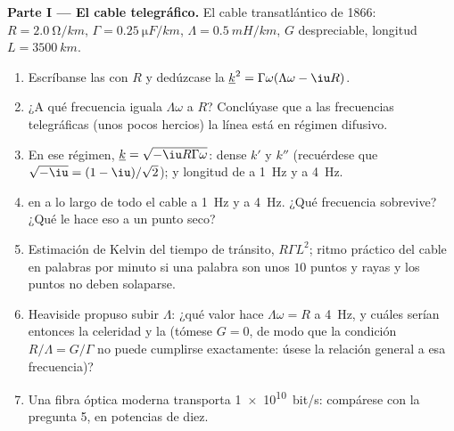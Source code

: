 \begin{problem}
\label{pb:b2:dispersion-wave-packets:1}

\medskip
\noindent\textbf{Parte I --- El cable telegráfico.}
El cable transatlántico de 1866: $R = \qty{2.0}{\ohm/km}$, $\Gamma = \qty{0.25}{\micro F/km}$,
$\Lambda = \qty{0.5}{mH/km}$, $G$ despreciable, longitud $L = \qty{3500}{km}$.
\begin{enumerate}
  \item Escríbanse las  con $R$ y dedúzcase la
         $\underline k^2 = \Gamma\omega(\Lambda\omega - \iu R)$.
  \item ¿A qué frecuencia iguala $\Lambda\omega$ a $R$? Conclúyase que a las
        frecuencias telegráficas (unos pocos hercios) la línea está en
        régimen difusivo.
  \item En ese régimen, $\underline k = \sqrt{-\iu R\Gamma\omega}$: dense $k'$ y $k''$
        (recuérdese que $\sqrt{-\iu} = (1 - \iu)/\sqrt2$); 
        y longitud de  a \qty{1}{Hz} y a \qty{4}{Hz}.
  \item {} en  a lo largo de todo el cable a \qty{1}{Hz}
        y a \qty{4}{Hz}. ¿Qué frecuencia sobrevive? ¿Qué le hace eso a un
        punto seco?
  \item Estimación de Kelvin del tiempo de tránsito, $R\Gamma L^2$; ritmo
        práctico del cable en palabras por minuto si una palabra son unos
        $10$ puntos y rayas y los puntos no deben solaparse.
  \item Heaviside propuso subir $\Lambda$: ¿qué valor hace $\Lambda\omega = R$
        a \qty{4}{Hz}, y cuáles serían entonces la celeridad y la
         (tómese $G = 0$, de modo que la condición
        $R/\Lambda = G/\Gamma$ no puede cumplirse exactamente: úsese la
        relación general a esa frecuencia)?
  \item Una fibra óptica moderna transporta \qty{1e10}{bit/s}: compárese
        con la pregunta 5, en potencias de diez.
\end{enumerate}


\end{problem}
